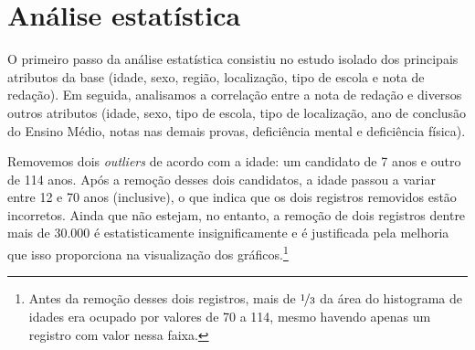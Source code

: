\documentclass[12pt]{article}
\newcommand{\reffig}[1]{Fig.~\ref{fig:#1}}
\begin{document}
\section{Análise estatística}
\label{sec:analise-estatistica}
O primeiro passo da análise estatística consistiu no estudo isolado dos principais atributos da base (idade, sexo, região, localização, tipo de escola e nota de redação).
Em seguida, analisamos a correlação entre a nota de redação e diversos outros atributos (idade, sexo, tipo de escola, tipo de localização, ano de conclusão do Ensino Médio, notas nas demais provas, deficiência mental e deficiência física).

Removemos dois \emph{outliers} de acordo com a idade: um candidato de 7 anos e outro de 114 anos.
Após a remoção desses dois candidatos, a idade passou a variar entre 12 e 70 anos (inclusive), o que indica que os dois registros removidos estão incorretos.
Ainda que não estejam, no entanto, a remoção de dois registros dentre mais de 30.000 é estatisticamente insignificamente e é justificada pela melhoria que isso proporciona na visualização dos gráficos.\footnote{Antes da remoção desses dois registros, mais de $\nicefrac{1}{3}$ da área do histograma de idades era ocupado por valores de 70 a 114, mesmo havendo apenas um registro com valor nessa faixa.}

\end{document}
